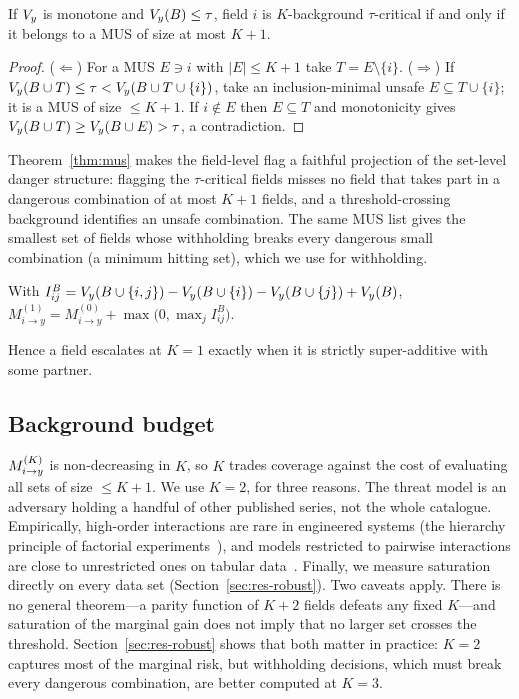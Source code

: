 \begin{theorem}\label{thm:mus}
If $V_y$ is monotone and $V_y(B)\le\tau$, field $i$ is $K$-background $\tau$-critical if and
only if it belongs to a MUS of size at most $K+1$.
\end{theorem}
\begin{proof}
($\Leftarrow$) For a MUS $E\ni i$ with $|E|\le K+1$ take $T=E\setminus\{i\}$.
($\Rightarrow$) If $V_y(B\cup T)\le\tau<V_y(B\cup T\cup\{i\})$, take an inclusion-minimal unsafe
$E\subseteq T\cup\{i\}$; it is a MUS of size $\le K+1$. If $i\notin E$ then $E\subseteq T$ and
monotonicity gives $V_y(B\cup T)\ge V_y(B\cup E)>\tau$, a contradiction.
\end{proof}
Theorem~\ref{thm:mus} makes the field-level flag a faithful projection of the set-level
danger structure: flagging the $\tau$-critical fields misses no field that takes part in a
dangerous combination of at most $K+1$ fields, and a threshold-crossing background identifies an unsafe combination.
The same MUS list gives the smallest set of fields whose withholding breaks every dangerous
small combination (a minimum hitting set), which we use for withholding.


\begin{proposition}[Closed form at $K=1$]\label{prop:k1}
With $I^B_{ij}=V_y(B\cup\{i,j\})-V_y(B\cup\{i\})-V_y(B\cup\{j\})+V_y(B)$,
$M^{(1)}_{i\to y}=M^{(0)}_{i\to y}+\max\big(0,\max_{j} I^{B}_{ij}\big)$.
\end{proposition}
Hence a field escalates at $K=1$ exactly when it is strictly super-additive with some partner.

\subsection{Background budget}
$M^{(K)}_{i\to y}$ is non-decreasing in $K$, so $K$ trades coverage against the cost of evaluating all sets
of size $\le K+1$. We use $K=2$, for three reasons. The threat model is an adversary holding a
handful of other published series, not the whole catalogue. Empirically, high-order
interactions are rare in engineered systems (the hierarchy principle of factorial
experiments~\cite{li2006regularities}), and models restricted to pairwise interactions are
close to unrestricted ones on tabular data~\cite{lou2013ga2m}. Finally, we measure saturation
directly on every data set (Section~\ref{sec:res-robust}). Two caveats apply. There is no general
theorem---a parity function of $K+2$ fields defeats any fixed $K$---and saturation of the marginal gain
does not imply that no larger set crosses the threshold. Section~\ref{sec:res-robust} shows that both
matter in practice: $K=2$ captures most of the marginal risk, but withholding decisions, which must break
every dangerous combination, are better computed at $K=3$.

